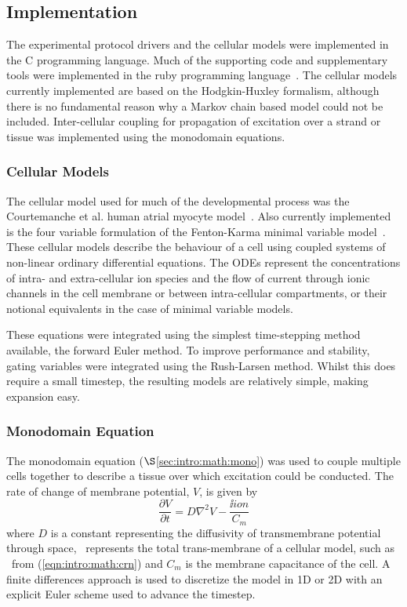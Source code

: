 \subsection{Implementation}

The experimental protocol drivers and the cellular models were implemented in
the C programming language.
Much of the supporting code and supplementary tools were implemented in the ruby
programming language~\cite{Flanagan2008}.
The cellular models currently implemented are based on the Hodgkin-Huxley
formalism, although there is no fundamental reason why a Markov chain based
model could not be included.
Inter-cellular coupling for propagation of excitation over a strand or tissue
was implemented using the monodomain equations.

\subsubsection{Cellular Models}

The cellular model used for much of the developmental process was the
Courtemanche et al. human atrial myocyte model~\cite{CRN98}.
Also currently implemented is the four variable formulation of the Fenton-Karma
minimal variable model~\cite{Bueno-Orovio2008}.
These cellular models describe the behaviour of a cell using coupled systems of
non-linear ordinary differential equations.
The ODEs represent the concentrations of intra- and extra-cellular ion species
and the flow of current through ionic channels in the cell membrane or between
intra-cellular compartments, or their notional equivalents in the case of
minimal variable models.

These equations were integrated using the simplest time-stepping method
available, the forward Euler method.
To improve performance and stability, gating variables were integrated using the
Rush-Larsen method.
Whilst this does require a small timestep, the resulting models are relatively
simple, making expansion easy.


\subsubsection{Monodomain Equation}

The monodomain equation ($\S$\ref{sec:intro:math:mono}) was used to couple multiple cells together to describe
a tissue over which excitation could be conducted.
The rate of change of membrane potential, $V$, is given by
\begin{equation}
\label{eqn:toolkit:monodomain}
\frac{\partial V}{\partial t} = D \nabla^{2} V - \frac{\ii{ion}}{C_{m}}
\end{equation}
where $D$ is a constant representing the diffusivity of transmembrane potential through
space, \ represents the total trans-membrane of a cellular model, such
as \ from (\ref{eqn:intro:math:crn}) and $C_{m}$ is the membrane capacitance
of the cell.
A finite differences approach is used to discretize the model in 1D or 2D with
an explicit Euler scheme used to advance the timestep.

